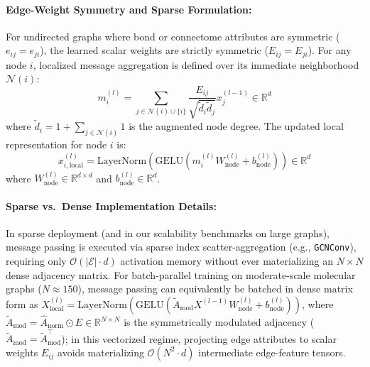 \documentclass[10pt]{article}
\begin{document}
\paragraph{Edge-Weight Symmetry and Sparse Formulation:} For undirected graphs where bond or connectome attributes are symmetric ($e_{ij} = e_{ji}$), the learned scalar weights are strictly symmetric ($E_{ij} = E_{ji}$). For any node $i$, localized message aggregation is defined over its immediate neighborhood $\mathcal{N}(i)$:
\begin{equation}
m_i^{(l)} = \sum_{j \in \mathcal{N}(i) \cup \{i\}} \frac{E_{ij}}{\sqrt{\tilde{d}_i \tilde{d}_j}} x_j^{(l-1)} \in \mathbb{R}^d
\end{equation}
where $\tilde{d}_i = 1 + \sum_{j \in \mathcal{N}(i)} 1$ is the augmented node degree. The updated local representation for node $i$ is:
\begin{equation}
x_{i, \text{local}}^{(l)} = \text{LayerNorm}\left( \text{GELU}\left( m_i^{(l)} W_{\text{node}}^{(l)} + b_{\text{node}}^{(l)} \right) \right) \in \mathbb{R}^d
\end{equation}
where $W_{\text{node}}^{(l)} \in \mathbb{R}^{d \times d}$ and $b_{\text{node}}^{(l)} \in \mathbb{R}^d$. 

\paragraph{Sparse vs.\ Dense Implementation Details:} In sparse deployment (and in our scalability benchmarks on large graphs), message passing is executed via sparse index scatter-aggregation (e.g., \texttt{GCNConv}), requiring only $\mathcal{O}(|\mathcal{E}| \cdot d)$ activation memory without ever materializing an $N \times N$ dense adjacency matrix. For batch-parallel training on moderate-scale molecular graphs ($N \approx 150$), message passing can equivalently be batched in dense matrix form as $X^{(l)}_{\text{local}} = \text{LayerNorm}(\text{GELU}(\tilde{A}_{\text{mod}} X^{(l-1)} W_{\text{node}}^{(l)} + b_{\text{node}}^{(l)}))$, where $\tilde{A}_{\text{mod}} = \hat{A}_{\text{norm}} \odot E \in \mathbb{R}^{N \times N}$ is the symmetrically modulated adjacency ($\tilde{A}_{\text{mod}} = \tilde{A}_{\text{mod}}^\top$); in this vectorized regime, projecting edge attributes to scalar weights $E_{ij}$ avoids materializing $\mathcal{O}(N^2 \cdot d)$ intermediate edge-feature tensors.
\end{document}
